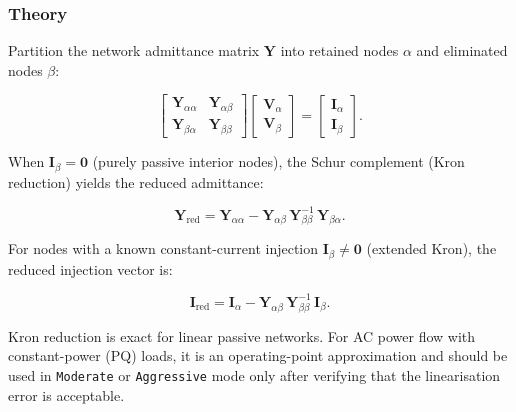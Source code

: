 \subsubsection{Theory}

Partition the network admittance matrix $\mathbf{Y}$ into retained nodes
$\alpha$ and eliminated nodes $\beta$:

\begin{equation}
  \begin{bmatrix} \mathbf{Y}_{\alpha\alpha} & \mathbf{Y}_{\alpha\beta} \\
                  \mathbf{Y}_{\beta\alpha}  & \mathbf{Y}_{\beta\beta}  \end{bmatrix}
  \begin{bmatrix} \mathbf{V}_\alpha \\ \mathbf{V}_\beta \end{bmatrix}
  =
  \begin{bmatrix} \mathbf{I}_\alpha \\ \mathbf{I}_\beta \end{bmatrix}.
  \label{eq:kron-full}
\end{equation}

When $\mathbf{I}_\beta = \mathbf{0}$ (purely passive interior nodes), the
Schur complement (Kron reduction) yields the reduced admittance:

\begin{equation}
  \boxed{\mathbf{Y}_{\text{red}} = \mathbf{Y}_{\alpha\alpha}
         - \mathbf{Y}_{\alpha\beta}\,\mathbf{Y}_{\beta\beta}^{-1}\,
           \mathbf{Y}_{\beta\alpha}.}
  \label{eq:kron-red}
\end{equation}

For nodes with a known constant-current injection $\mathbf{I}_\beta \neq
\mathbf{0}$ (extended Kron), the reduced injection vector is:

\begin{equation}
  \mathbf{I}_{\text{red}} = \mathbf{I}_\alpha
    - \mathbf{Y}_{\alpha\beta}\,\mathbf{Y}_{\beta\beta}^{-1}\,\mathbf{I}_\beta.
  \label{eq:kron-inj}
\end{equation}

\begin{remark}
  Kron reduction is exact for linear passive networks.  For AC power flow
  with constant-power (PQ) loads, it is an operating-point approximation
  and should be used in \texttt{Moderate} or \texttt{Aggressive} mode only
  after verifying that the linearisation error is acceptable.
\end{remark}

